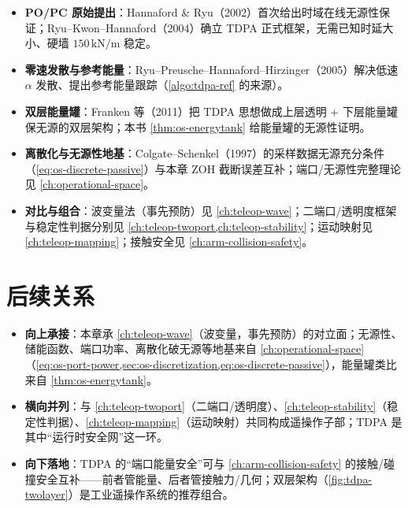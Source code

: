 \begin{itemize}
  \item \textbf{PO/PC 原始提出}：Hannaford \& Ryu（2002）首次给出时域在线无源性保证；Ryu--Kwon--Hannaford（2004）确立 TDPA 正式框架，无需已知时延大小、硬墙 $150\,\mathrm{kN/m}$ 稳定。
  \item \textbf{零速发散与参考能量}：Ryu--Preusche--Hannaford--Hirzinger（2005）解决低速 $\alpha$ 发散、提出参考能量跟踪（\cref{algo:tdpa-ref} 的来源）。
  \item \textbf{双层能量罐}：Franken 等（2011）把 TDPA 思想做成上层透明 + 下层能量罐保无源的双层架构；本书 \cref{thm:os-energytank} 给能量罐的无源性证明。
  \item \textbf{离散化与无源性地基}：Colgate--Schenkel（1997）的采样数据无源充分条件（\cref{eq:os-discrete-passive}）与本章 ZOH 截断误差互补；端口/无源性完整理论见 \cref{ch:operational-space}。
  \item \textbf{对比与组合}：波变量法（事先预防）见 \cref{ch:teleop-wave}；二端口/透明度框架与稳定性判据分别见 \cref{ch:teleop-twoport,ch:teleop-stability}；运动映射见 \cref{ch:teleop-mapping}；接触安全见 \cref{ch:arm-collision-safety}。
\end{itemize}

\section{后续关系}
\label{sec:tdpa-next}

\begin{itemize}
  \item \textbf{向上承接}：本章承 \cref{ch:teleop-wave}（波变量，事先预防）的对立面；无源性、储能函数、端口功率、离散化破无源等地基来自 \cref{ch:operational-space}（\cref{eq:os-port-power,sec:os-discretization,eq:os-discrete-passive}），能量罐类比来自 \cref{thm:os-energytank}。
  \item \textbf{横向并列}：与 \cref{ch:teleop-twoport}（二端口/透明度）、\cref{ch:teleop-stability}（稳定性判据）、\cref{ch:teleop-mapping}（运动映射）共同构成遥操作子部；TDPA 是其中“运行时安全网”这一环。
  \item \textbf{向下落地}：TDPA 的“端口能量安全”可与 \cref{ch:arm-collision-safety} 的接触/碰撞安全互补——前者管能量、后者管接触力/几何；双层架构（\cref{fig:tdpa-twolayer}）是工业遥操作系统的推荐组合。
\end{itemize}

